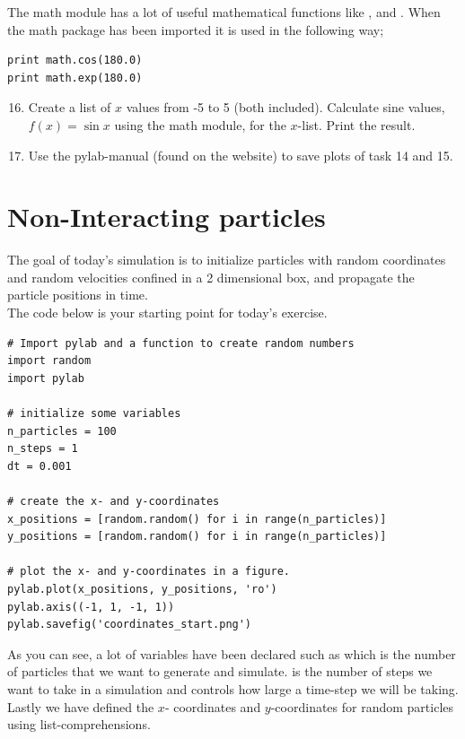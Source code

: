 \documentclass{article}
\begin{document}
The math module has a lot of useful mathematical functions like ,
 and . When the math package has been imported it is used
in the following way;

\begin{lstlisting}
print math.cos(180.0)
print math.exp(180.0)
\end{lstlisting}

\begin{enumerate}
  \setcounter{enumi}{15}
  \item Create a list of $x$ values from -5 to 5 (both included).
    Calculate sine values, $f(x) = \sin{x}$ using the math module,
    for the $x$-list.
    Print the result.
  \item Use the pylab-manual (found on the website) to save plots of 
    task 14 and 15.
\end{enumerate}


\newpage
\section{Non-Interacting particles}

The goal of today's simulation is to initialize particles with random
coordinates and random velocities confined in a 2 dimensional box,
and propagate the particle positions in time.\\

The code below is your starting point for today's exercise.

\begin{lstlisting}
# Import pylab and a function to create random numbers
import random
import pylab

# initialize some variables
n_particles = 100
n_steps = 1
dt = 0.001

# create the x- and y-coordinates
x_positions = [random.random() for i in range(n_particles)]
y_positions = [random.random() for i in range(n_particles)]

# plot the x- and y-coordinates in a figure.
pylab.plot(x_positions, y_positions, 'ro')
pylab.axis((-1, 1, -1, 1))
pylab.savefig('coordinates_start.png')

\end{lstlisting}

As you can see, a lot of variables have been declared such as
 which
is the number of particles that we want to generate and simulate.
 is
the number of steps we want to take in a simulation
and  controls how large a time-step we will be taking.
Lastly we have defined the
$x$- coordinates and
$y$-coordinates for
 random particles using list-comprehensions.
\end{document}
